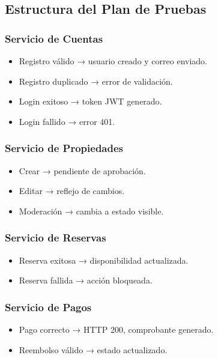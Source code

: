 	\subsection*{Estructura del Plan de Pruebas}
		\subsubsection*{Servicio de Cuentas}
			\begin{itemize}
				\item Registro válido → usuario creado y correo enviado.
				\item Registro duplicado → error de validación.
				\item Login exitoso → token JWT generado.
				\item Login fallido → error 401.
			\end{itemize}
		
		\subsubsection*{Servicio de Propiedades}
			\begin{itemize}
				\item Crear → pendiente de aprobación.
				\item Editar → reflejo de cambios.
				\item Moderación → cambia a estado visible.
			\end{itemize}
		
		\subsubsection*{Servicio de Reservas}
			\begin{itemize}
				\item Reserva exitosa → disponibilidad actualizada.
				\item Reserva fallida → acción bloqueada.
			\end{itemize}
		
		\subsubsection*{Servicio de Pagos}
			\begin{itemize}
				\item Pago correcto → HTTP 200, comprobante generado.
				\item Reembolso válido → estado actualizado.
			\end{itemize}
		
